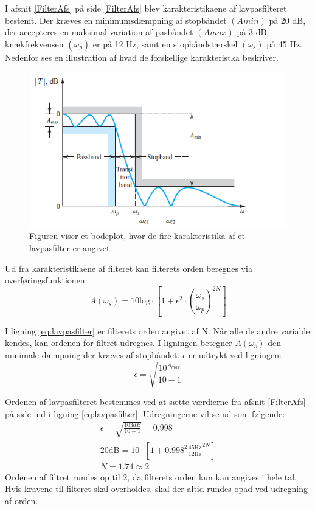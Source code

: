 I afsnit \ref{FilterAfs} på side \ref{FilterAfs} blev karakteristikaene af lavpasfilteret bestemt. Der kræves en minimumsdæmpning af stopbåndet $(Amin)$ på 20 dB, der accepteres en maksimal variation af pasbåndet $(Amax)$ på 3 dB, knækfrekvensen $(\omega _p)$ er på 12 Hz, samt en stopbåndstærskel $( \omega _s)$ på 45 Hz. Nedenfor ses en illustration af hvad de forskellige karakteristka beskriver.

\begin{figure}[H]
\centering
\includegraphics[scale=1]{figures/cProblemloesning/Lavpasfilter_generisk.PNG}
\caption{Figuren viser et bodeplot, hvor de fire karakteristika af et lavpasfilter er angivet.}
\label{fig:lavpasfilter_generisk}
\end{figure} 

\noindent Ud fra karakteristikaene af filteret kan filterets orden beregnes via overføringsfunktionen:
\begin{equation} \label{eq:lavpasfilter}
A(\omega_s) = 10 \text{log} \cdot \left[1 + \epsilon^2 \cdot (\frac{\omega _s}{\omega _p})^{2N}\right] 
\end{equation}

\noindent I ligning \ref{eq:lavpasfilter} er filterets orden angivet af N. Når alle de andre variable kendes, kan ordenen for filtret udregnes. I ligningen betegner $A(\omega _s)$ den minimale dæmpning der kræves af stopbåndet. $\epsilon$ er udtrykt ved ligningen:
\begin{equation}
\epsilon = \sqrt{\frac{10^{A_{max}}}{10 - 1}}
\end{equation}

Ordenen af lavpasfilteret bestemmes ved at sætte værdierne fra afsnit \ref{FilterAfs} på side \pageref{FilterAfs} ind i ligning \ref{eq:lavpasfilter}. Udregningerne vil se ud som følgende:
\begin{align}
\epsilon = \sqrt{\frac{103dB}{10 - 1}} = 0.998 \\
20\text{dB} = 10 \cdot \left[1 + 0.998^2 \frac{45\text{Hz}}{12\text{Hz}}^{2N}\right] \\
N = 1.74 \approx 2
\end{align}
\noindent Ordenen af filtret rundes op til 2, da filterets orden kun kan angives i hele tal. Hvis kravene til filteret skal overholdes, skal der altid rundes opad ved udregning af orden.

